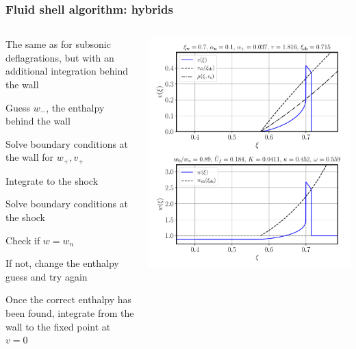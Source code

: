 \begin{frame}
    \frametitle{Fluid shell algorithm: hybrids}
    \begin{columns}
    \begin{column}{0.6\textwidth}
        \begin{itemize}
                \item The same as for subsonic deflagrations, but with an additional integration behind the wall
                { \color{gray}
                \item Guess $w_-$, the enthalpy behind the wall
                \item Solve boundary conditions at the wall for $w_+, v_+$
                \item Integrate to the shock
                \item Solve boundary conditions at the shock
                \item Check if $w=w_n$
                \item If not, change the enthalpy guess and try again
                }
                \item Once the correct enthalpy has been found, integrate from the wall to the fixed point at $v=0$
        \end{itemize}
    \end{column}
    \begin{column}{0.4\textwidth}
        \includegraphics[width=\textwidth]{../fig/lecture_notes/shell_plot_vw_07_alphan_01_review}
    \end{column}
    \end{columns}
\end{frame}

